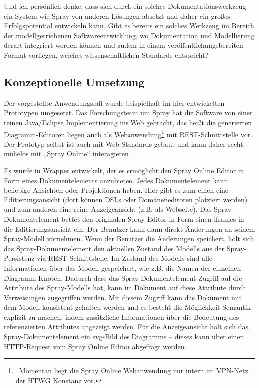  
Und ich persönlich denke, dass sich durch ein solches Dokumentationswerkzeug ein System wie Spray von anderen Lösungen absetzt und daher ein großes Erfolgspotential entwickeln kann. Gibt es bereits ein solches Werkzeug im Bereich der modellgetriebenen Softwareentwicklung, wo Dokumentation und Modellierung derart integriert werden können und zudem in einem veröffentlichungsbereiten Format vorliegen, welches wissenschaftlichen Standards entspricht?

 
\subsection{Konzeptionelle Umsetzung}\label{}
 
Der vorgestellte Anwendungsfall wurde beispielhaft im hier entwickelten Prototypen umgesetzt. Das Forschungsteam um Spray hat die Software von einer reinen Java/Eclipse Implementierung ins Web gebracht, das heißt die generierten Diagramm-Editoren liegen auch als Webanwendung\footnote{~Momentan liegt die Spray Online Webanwendung nur intern im VPN-Netz der HTWG Konstanz vor.} mit REST-Schnittstelle vor. Der Prototyp selbst ist auch mit Web Standards gebaut und kann daher recht mühelos mit „Spray Online“ interagieren.

 
Es wurde in Wrapper entwickelt, der es ermöglicht den Spray Online Editor in Form eines Dokumentelements anzubieten. Jedes Dokumentelement kann beliebige Ansichten oder Projektionen haben. Hier gibt es zum einen eine Editierungsansicht (dort können DSLs oder Domäneneditoren platziert werden) und zum anderen eine reine Anzeigeansicht (z.B. als Webseite). Das Spray-Dokumentelement bettet den originalen Spray-Editor in Form einen iframes in die Editierungsansicht ein. Der Benutzer kann dann direkt Änderungen an seinem Spray-Modell vornehmen. Wenn der Benutzer die Änderungen speichert, holt sich das Spray-Dokumentelement den aktuellen Zustand des Modells aus der Spray-Persistenz via REST-Schnittstelle. Im Zustand des Modells sind alle Informationen über das Modell gespeichert, wie z.B. die Namen der einzelnen Diagramm-Knoten. Dadurch dass das Spray-Dokumentelement Zugriff auf die Attribute des Spray-Modells hat, kann im Dokument auf diese Attribute durch Verweisungen zugegriffen werden. Mit diesem Zugriff kann das Dokument mit dem Modell konsistent gehalten werden und es besteht die Möglichkeit Semantik explizit zu machen, indem zusätzliche Informationen über die Bedeutung des referenzierten Attributes angezeigt werden. Für die Anzeigeansicht holt sich das Spray-Dokumentelement ein svg-Bild des Diagramms -- dieses kann über einen HTTP-Request vom Spray Online Editor abgefragt werden.

